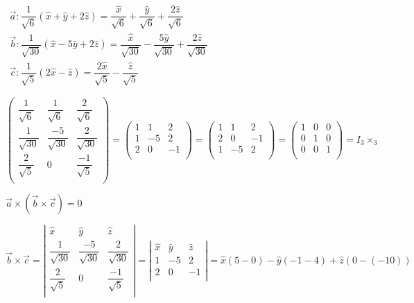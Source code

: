 \documentclass[fleqn]{article}
\begin{document}
\begin{enumerate}
  \noindent
  $
  \begin{array}{lll}
    \overrightarrow{a}: \dfrac{1}{\sqrt{6}}(\hat{x}+\hat{y}+2\hat{z})=\dfrac{\hat{x}}{\sqrt{6}}+\dfrac{\hat{y}}{\sqrt{6}}+\dfrac{2\hat{z}}{\sqrt{6}} \\
    \overrightarrow{b}: \dfrac{1}{\sqrt{30}}(\hat{x}-5\hat{y}+2\hat{z})=\dfrac{\hat{x}}{\sqrt{30}}-\dfrac{5\hat{y}}{\sqrt{30}}+\dfrac{2\hat{z}}{\sqrt{30}} \\
    \overrightarrow{c}: \dfrac{1}{\sqrt{5}}(2\hat{x}-\hat{z})=\dfrac{2\hat{x}}{\sqrt{5}}-\dfrac{\hat{z}}{\sqrt{5}}
    \end{array}  
  $
  \bigbreak
  
  \noindent
  $\displaystyle
    \begin{pmatrix}
      \dfrac{1}{\sqrt{6}} & \dfrac{1}{\sqrt{6}} & \dfrac{2}{\sqrt{6}}  \\
      \dfrac{1}{\sqrt{30}} & \dfrac{-5}{\sqrt{30}} & \dfrac{2}{\sqrt{30}} \\ 
      \dfrac{2}{\sqrt{5}} & 0 & \dfrac{-1}{\sqrt{5}} \\ 
    \end{pmatrix}
    =
    \begin{pmatrix}
      1 & 1 & 2\\
      1 & -5 & 2 \\ 
      2 & 0 & -1 \\ 
    \end{pmatrix}
    = 
    \begin{pmatrix}
      1 & 1 & 2\\
      2 & 0 & -1\\ 
      1 & -5 & 2\\ 
    \end{pmatrix}
    = 
    \begin{pmatrix}
      1 & 0 & 0\\
      0 & 1 & 0\\ 
      0 & 0 & 1\\ 
    \end{pmatrix}
    =
    I_3\times_3
  $
  
  \bigbreak
  
  
  $
  \overrightarrow{a}\times(\overrightarrow{b}\times\overrightarrow{c})=0
  $
  
  $
  \overrightarrow{b}\times\overrightarrow{c}
  =
  \left|
  \begin{matrix}
    \hat{x} & \hat{y} & \hat{z} \\
    \dfrac{1}{\sqrt{30}} & \dfrac{-5}{\sqrt{30}} & \dfrac{2}{\sqrt{30}} \\ 
    \dfrac{2}{\sqrt{5}} & 0 & \dfrac{-1}{\sqrt{5}} \\ 
  \end{matrix}
  \right|
  =
  \left|
  \begin{matrix}
    \hat{x} & \hat{y} & \hat{z} \\
    1 & -5 & 2 \\ 
    2 & 0 & -1 \\ 
  \end{matrix}
  \right|
  =
  \hat{x}(5-0)-\hat{y}(-1-4)+\hat{z}(0-(-10))
  $
  

\end{enumerate}
\end{document}
